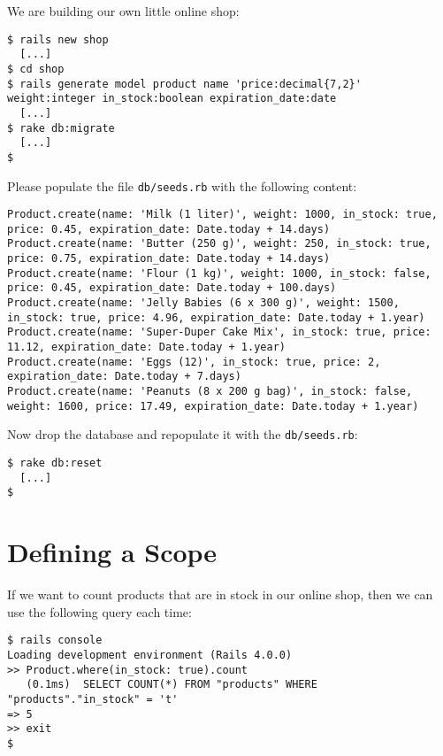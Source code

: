 \documentclass[a4paper]{book}
\newcounter{tab}[chapter]
\begin{document}
We are building our own little online shop:

\begin{shaded}\begin{verbatim}
$ rails new shop
  [...]
$ cd shop
$ rails generate model product name 'price:decimal{7,2}' weight:integer in_stock:boolean expiration_date:date
  [...]
$ rake db:migrate
  [...]
$
\end{verbatim}\end{shaded}

Please populate the file \texttt{db/seeds.rb} with the following content:

\begin{shaded}\begin{verbatim}
Product.create(name: 'Milk (1 liter)', weight: 1000, in_stock: true, price: 0.45, expiration_date: Date.today + 14.days)
Product.create(name: 'Butter (250 g)', weight: 250, in_stock: true, price: 0.75, expiration_date: Date.today + 14.days)
Product.create(name: 'Flour (1 kg)', weight: 1000, in_stock: false, price: 0.45, expiration_date: Date.today + 100.days)
Product.create(name: 'Jelly Babies (6 x 300 g)', weight: 1500, in_stock: true, price: 4.96, expiration_date: Date.today + 1.year)
Product.create(name: 'Super-Duper Cake Mix', in_stock: true, price: 11.12, expiration_date: Date.today + 1.year)
Product.create(name: 'Eggs (12)', in_stock: true, price: 2, expiration_date: Date.today + 7.days)
Product.create(name: 'Peanuts (8 x 200 g bag)', in_stock: false, weight: 1600, price: 17.49, expiration_date: Date.today + 1.year)
\end{verbatim}\end{shaded}

Now drop the database and repopulate it with the \texttt{db/seeds.rb}:

\begin{shaded}\begin{verbatim}
$ rake db:reset
  [...]
$
\end{verbatim}\end{shaded}

\section{Defining a Scope}\label{defining-a-scope}

If we want to count products that are in stock in our online shop, then we can use the following query each time:

\begin{shaded}\begin{verbatim}
$ rails console
Loading development environment (Rails 4.0.0)
>> Product.where(in_stock: true).count
   (0.1ms)  SELECT COUNT(*) FROM "products" WHERE "products"."in_stock" = 't'
=> 5
>> exit
$
\end{verbatim}\end{shaded}
\end{document}
